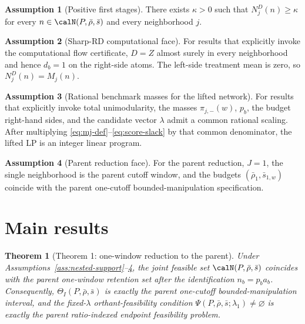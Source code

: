 \documentclass[11pt]{article}
\theoremstyle{definition}
\newtheorem{assumption}{Assumption}
\theoremstyle{plain}
\newtheorem{theorem}{Theorem}
\theoremstyle{remark}
\begin{document}
\begin{assumption}[Positive first stages]\label{ass:first-stage}
There exists \(\kappa>0\) such that \(N_j^D(n)\ge \kappa\) for every
\(n\in\calN(P,\bar\rho,\bar s)\) and every neighborhood \(j\).
\end{assumption}

\begin{assumption}[Sharp-RD computational face]\label{ass:sharp-rd}
For results that explicitly invoke the computational flow certificate, \(D=Z\) almost surely in
every neighborhood and hence \(d_b=1\) on the right-side atoms.  The left-side treatment mean
is zero, so \(N_j^D(n)=M_j(n)\).
\end{assumption}

\begin{assumption}[Rational benchmark masses for the lifted network]\label{ass:rational}
For results that explicitly invoke total unimodularity, the masses
\(\pi_{j,-}(w)\), \(p_b\), the budget right-hand sides, and the candidate vector \(\lambda\)
admit a common rational scaling.  After multiplying
\eqref{eq:mj-def}--\eqref{eq:score-slack} by that common denominator, the lifted LP is an
integer linear program.
\end{assumption}

\begin{assumption}[Parent reduction face]\label{ass:parent-face}
For the parent reduction, \(J=1\), the single neighborhood is the parent cutoff window, and the
budgets \((\bar\rho_1,\bar s_{1,w})\) coincide with the parent one-cutoff bounded-manipulation
specification.
\end{assumption}

\section{Main results}
\begin{theorem}[Theorem 1: one-window reduction to the parent]\label{thm:parent-reduction}
Under Assumptions~\ref{ass:nested-support}--\ref{ass:parent-face}, the joint feasible set
\(\calN(P,\bar\rho,\bar s)\) coincides with the parent one-window retention set after the
identification \(n_b=p_b a_b\).  Consequently, \(\Theta_I(P,\bar\rho,\bar s)\) is exactly the
parent one-cutoff bounded-manipulation interval, and the fixed-\(\lambda\)
orthant-feasibility condition \(\Psi(P,\bar\rho,\bar s;\lambda_1)\neq\varnothing\) is exactly
the parent ratio-indexed endpoint feasibility problem.
\end{theorem}
\end{document}
